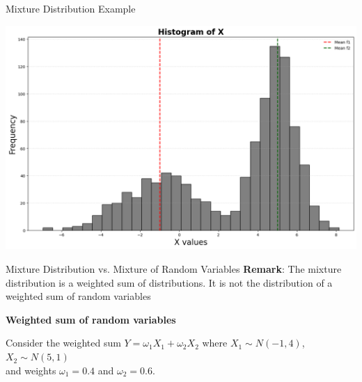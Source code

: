 \documentclass[8pt]{beamer}
\begin{document}
\begin{frame}[fragile]{Mixture Distribution Example}
\begin{center}
\includegraphics[width=\textwidth]{chapter2-part1-plot4.png}
\end{center}
\end{frame}

\begin{frame}[fragile]{Mixture Distribution vs. Mixture of Random Variables}
\textbf{Remark}: The mixture distribution is a weighted sum of distributions. \alert{It is not the distribution of a weighted sum of random variables}

\vspace{3mm}

{\bf Weighted sum of random variables}

Consider the weighted sum $Y=\omega_1 X_1+\omega_2 X_2$ where
$X_1 \sim N(-1,4)$, \\
$X_2 \sim N(5,1)$  \\
and weights $\omega_1=0.4$ and $\omega_2=0.6$.
\end{frame}
\end{document}
